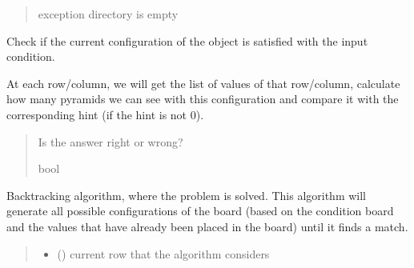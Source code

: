 \documentclass[letterpaper,10pt,english]{sphinxmanual}
\begin{document}
\begin{fulllineitems}
\begin{fulllineitems}
\begin{quote}
\begin{description}
\sphinxAtStartPar
{} \textendash{} exception \sphinxhyphen{} directory is empty

\end{description}\end{quote}

\end{fulllineitems}


\begin{fulllineitems}
\label{\detokenize{board_resolver:board_resolver.BoardResolver.checkResultWithCond}}
\pysigstartsignatures
{}
\pysigstopsignatures
\sphinxAtStartPar
Check if the current configuration of the object is satisfied with
the input condition.

\sphinxAtStartPar
At each row/column, we will get the list of values of that row/column,
calculate how many pyramids we can see with this configuration and
compare it with the corresponding hint (if the hint is not 0).
\begin{quote}\begin{description}
\sphinxAtStartPar
Is the answer right or wrong?

\sphinxAtStartPar
bool

\end{description}\end{quote}

\end{fulllineitems}


\begin{fulllineitems}
\label{\detokenize{board_resolver:board_resolver.BoardResolver.backtracking}}
\pysigstartsignatures
{}
\pysigstopsignatures
\sphinxAtStartPar
Backtracking algorithm, where the problem is solved.
This algorithm will generate all possible configurations of the board
(based on the condition board and the values that have already been
placed in the board) until it finds a match.
\begin{quote}\begin{description}
\begin{itemize}
\item {} 
\sphinxAtStartPar
{} () \textendash{} current row that the algorithm considers


\end{itemize}
\end{description}
\end{quote}
\end{fulllineitems}
\end{fulllineitems}
\end{document}
